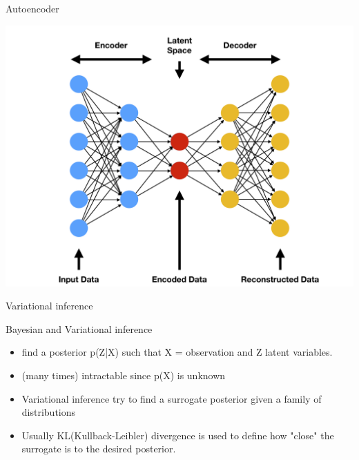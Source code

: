 \documentclass[presentation]{beamer}
\begin{document}
\begin{frame}[label={sec:org8624603}]{Autoencoder}
\begin{center}
\includegraphics[width=.9\linewidth]{./autoencoder.png}
\end{center}
\end{frame}
\begin{frame}[label={sec:org4d1a420}]{Variational inference}
\begin{block}{Bayesian and Variational inference}
\begin{itemize}
\item find a posterior p(Z|X) such that X = observation and Z latent
variables.
\item (many times) intractable since p(X) is unknown
\item Variational inference try to find a surrogate posterior given a
family of distributions
\item Usually KL(Kullback-Leibler) divergence is used to define how
"close" the surrogate is to the desired posterior.
\end{itemize}
\end{block}
\end{frame}
\end{document}
